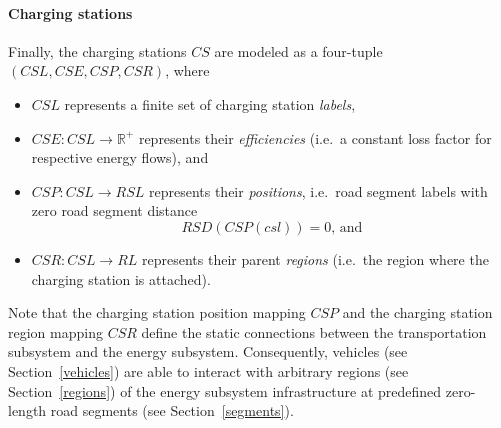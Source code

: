 \paragraph{Charging stations}
\label{charging_stations}

Finally, the charging stations $CS$ are modeled as a four-tuple $(CSL, CSE, CSP, CSR)$, where
\begin{itemize}
	\item $CSL$ represents a finite set of charging station \textit{labels},
	\item $CSE: CSL \rightarrow \mathbb{R}^+$ represents their \textit{efficiencies} (i.e.\ a constant loss factor for respective energy flows), and
	\item $CSP: CSL \rightarrow RSL$ represents their \textit{positions}, i.e.\ road segment labels with zero road segment distance
	\[
		RSD(CSP(csl)) = 0 \textrm{, and}
	\]
	\item $CSR: CSL \rightarrow RL$ represents their parent \textit{regions} (i.e.\ the region where the charging station is attached).
\end{itemize}
Note that the charging station position mapping $CSP$  and the charging station region mapping $CSR$ define the static connections between the transportation subsystem and the energy subsystem. Consequently, vehicles (see Section~\ref{vehicles}) are able to interact with arbitrary regions (see Section~\ref{regions}) of the energy subsystem infrastructure at predefined zero-length road segments (see Section~\ref{segments}).

